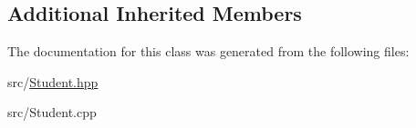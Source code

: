\subsection*{Additional Inherited Members}


The documentation for this class was generated from the following files\+:\begin{DoxyCompactItemize}
\item 
src/\mbox{\hyperlink{_student_8hpp}{Student.\+hpp}}\item 
src/Student.\+cpp\end{DoxyCompactItemize}
